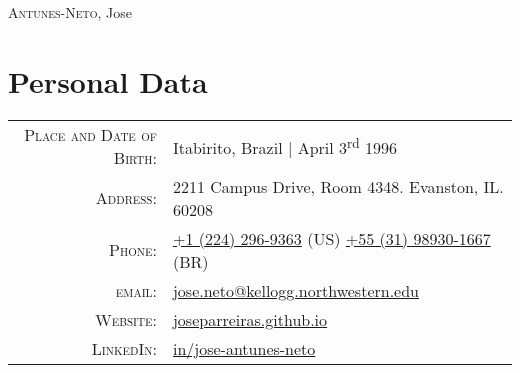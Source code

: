 \documentclass[a4paper,10pt]{article}
\begin{document}
\par{
    \centering
		{\Huge \textsc{Antunes-Neto}, Jose
	}\bigskip\par
}

\section{Personal Data}

\begin{tabular}{rp{9.75cm}}
    \textsc{Place and Date of Birth:} & Itabirito, Brazil  | April 3\textsuperscript{rd}  1996 \\
    \textsc{Address:}   & 2211 Campus Drive, Room 4348. Evanston, IL. 60208\\
    \textsc{Phone:}     & \href{tel:+12242969363}{+1 (224) 296-9363} (US) \quad \href{tel:+5531989301667}{+55 (31) 98930-1667} (BR) \\
    \textsc{email:}     & \href{mailto:jose.neto@kellogg.northwestern.edu}{jose.neto@kellogg.northwestern.edu} \\
    \textsc{Website:}   & \href{http://joseparreiras.github.io}{joseparreiras.github.io} \\
    \textsc{LinkedIn:}  & \href{https://www.linkedin.com/in/jose-antunes-neto/}{in/jose-antunes-neto}
\end{tabular}

\end{document}
